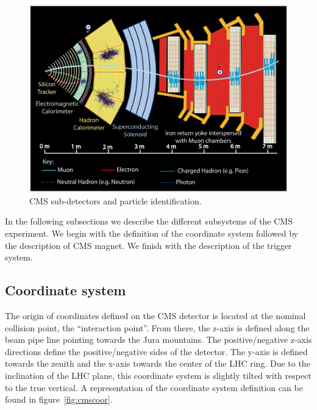 \begin{figure}[!Hhtbp]
  \begin{center}
    \includegraphics[width=\textwidth]{figs/PictureforPoint5_oct04_allp.jpg}
    \caption{CMS sub-detectors and particle identification. }
    \label{fig:cmsslice}
  \end{center}
\end{figure}

In the following subsections we describe the different subsystems of the CMS experiment. We begin with the definition of the coordinate system followed by the description of CMS magnet. We finish with the description of the trigger system. 

\subsection{Coordinate system}
\label{sec:Csys}

The origin of coordinates defined on the CMS detector is located at the nominal collision point, the ``interaction point''. From there, the z-axis is defined along the beam pipe line pointing towards the Jura mountains. The positive/negative z-axis directions define the positive/negative sides of the detector. The y-axis is defined towards the zenith and the x-axis towards the center of the LHC ring. Due to the inclination of the LHC plane, this coordinate system is slightly tilted with respect to the true vertical. A representation of the coordinate system definition can be found in figure~\ref{fig:cmscoor}. 

